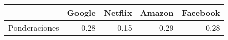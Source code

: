 \begin{table}[ht]
\centering
\begin{tabular}{rrrrr}
  \hline
 & Google & Netflix & Amazon & Facebook \\ 
  \hline
Ponderaciones & 0.28 & 0.15 & 0.29 & 0.28 \\ 
   \hline
\end{tabular}
\end{table}

